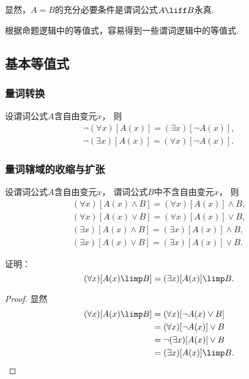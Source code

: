 显然，\(A=B\)的充分必要条件是谓词公式\(A \liff B\)永真.

根据命题逻辑中的等值式，容易得到一些谓词逻辑中的等值式.

\subsection{基本等值式}
\subsubsection{量词转换}
设谓词公式\(A\)含自由变元\(x\)，
则\begin{gather}
	\neg(\forall x)[A(x)]
	= (\exists x)[\neg A(x)],
	\label{equation:数理逻辑.量词转换1} \\
	\neg(\exists x)[A(x)]
	= (\forall x)[\neg A(x)].
	\label{equation:数理逻辑.量词转换2}
\end{gather}

\subsubsection{量词辖域的收缩与扩张}
设谓词公式\(A\)含自由变元\(x\)，
谓词公式\(B\)中不含自由变元\(x\)，
则\begin{gather}
	(\forall x)[A(x) \land B]
	= (\forall x)[A(x)] \land B, \\
	(\forall x)[A(x) \lor B]
	= (\forall x)[A(x)] \lor B, \\
	(\exists x)[A(x) \land B]
	= (\exists x)[A(x)] \land B, \\
	(\exists x)[A(x) \lor B]
	= (\exists x)[A(x)] \lor B.
\end{gather}

\begin{example}
证明：\begin{equation}
	(\forall x)[A(x) \limp B]
	= (\exists x)[A(x)] \limp B.
\end{equation}
\begin{proof}
显然\begin{align*}
	(\forall x)[A(x) \limp B]
	&= (\forall x)[\neg A(x) \lor B] \\
	&= (\forall x)[\neg A(x)] \lor B \\
	&= \neg(\exists x)[A(x)] \lor B \\
	&= (\exists x)[A(x)] \limp B.
	\qedhere
\end{align*}
\end{proof}
\end{example}

